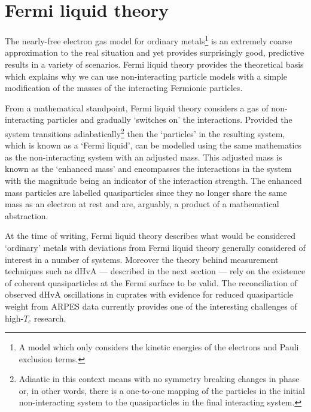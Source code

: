 

\section{Fermi liquid theory}
    \label{Sec:Theo:FermiLiquidTheory}

The nearly-free electron gas model for ordinary metals\footnote{A model which only considers the kinetic energies of the electrons and Pauli exclusion terms.} is an extremely coarse approximation to the real situation and yet provides surprisingly good, predictive results in a variety of scenarios. Fermi liquid theory provides the theoretical basis which explains why we can use non-interacting particle models with a simple modification of the masses of the interacting Fermionic particles.

From a mathematical standpoint, Fermi liquid theory considers a gas of non-interacting particles and gradually `switches on' the interactions. Provided the system transitions adiabatically\footnote{Adiaatic in this context means with no symmetry breaking changes in phase or, in other words, there is a one-to-one mapping of the particles in the initial non-interacting system to the quasiparticles in the final interacting system.} then the `particles' in the resulting system, which is known as a `Fermi liquid', can be modelled using the same mathematics as the non-interacting system with an adjusted mass. This adjusted mass is known as the `enhanced mass' and encompasses the interactions in the system with the magnitude being an indicator of the interaction strength. The enhanced mass particles are labelled quasiparticles since they no longer share the same mass as an electron at rest and are, arguably, a product of a mathematical abstraction.

At the time of writing, Fermi liquid theory describes what would be considered `ordinary' metals with deviations from Fermi liquid theory generally considered of interest in a number of systems. Moreover the theory behind measurement techniques such as \ac{dHvA} --- described in the next section --- rely on the existence of coherent quasiparticles at the Fermi surface to be valid. The reconciliation of observed \ac{dHvA} oscillations in cuprates with evidence for reduced quasiparticle weight from \ac{ARPES} data currently provides one of the interesting challenges of high-$T_c$ research.
